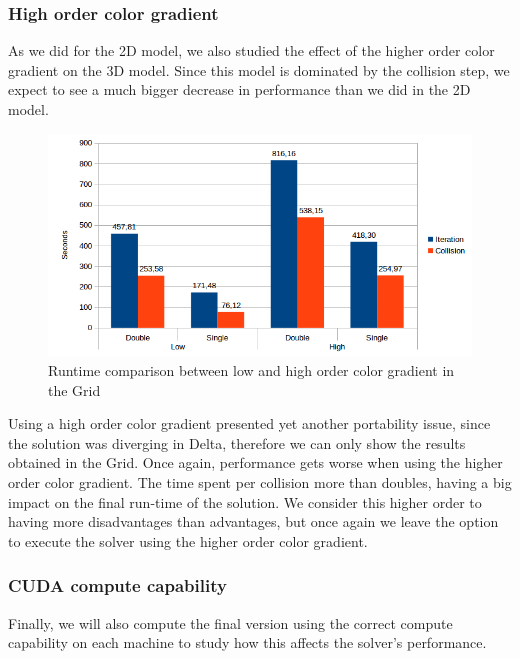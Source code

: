 \documentclass[12pt, openany]{book}
\begin{document}
\subsubsection{High order color gradient}
As we did for the 2D model, we also studied the effect of the higher order color gradient on the 3D model. Since this model is dominated by the collision step, we expect to see a much bigger decrease in performance than we did in the 2D model.

  \begin{figure}[H]
  	\centering
  	\includegraphics[width=\linewidth]{Resources/Images/highgrid.png}
  	\caption{Runtime comparison between low and high order color gradient in the Grid}
  	\label{fig:highgrid}
  \end{figure}
  
  Using a high order color gradient presented yet another portability issue, since the solution was diverging in Delta, therefore we can only show the results obtained in the Grid. Once again, performance gets worse when using the higher order color gradient. The time spent per collision more than doubles, having a big impact on the final run-time of the solution. We consider this higher order to having more disadvantages than advantages, but once again we leave the option to execute the solver using the higher order color gradient.


\subsubsection{CUDA compute capability}
Finally, we will also compute the final version using the correct compute capability on each machine to study how this affects the solver's performance.
\end{document}
